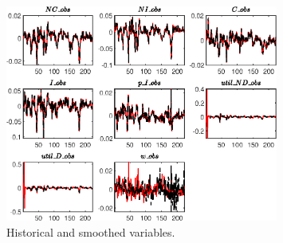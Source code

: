  
\begin{figure}[H]
\centering 
\includegraphics[width=0.80\textwidth]{RBC_sectoral/graphs/RBC_sectoral_HistoricalAndSmoothedVariables1}
\caption{Historical and smoothed variables.}\label{Fig:HistoricalAndSmoothedVariables:1}
\end{figure}


